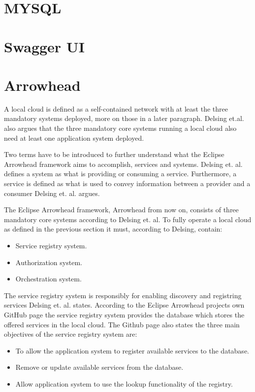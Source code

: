 \section{MYSQL}
\section{Swagger UI}
\section{Arrowhead}
A local cloud is defined as a self-contained network with at least the three mandatory systems deployed, more on those in a later paragraph. 
Delsing et.al. also argues that the three mandatory core systems running a local cloud also need at least one application system deployed.\cite{Delsing2017}

Two terms have to be introduced to further understand what the Eclipse Arrowhead framework aims to accomplish, services and systems.
Delsing et. al. defines a system as what is providing or consuming a service.\cite{Delsing2017} 
Furthermore, a service is defined as what is used to convey information between a provider and a consumer Delsing et. al. argues.\cite{Delsing2017}

The Eclipse Arrowhead framework, Arrowhead from now on, consists of three mandatory core systems according to Delsing et. al.\cite{Delsing2017}
To fully operate a local cloud as defined in the previous section it must, according to Delsing, contain:
\begin{itemize}
    \item Service registry system.
    \item Authorization system. 
    \item Orchestration system.\cite{Delsing2017}
\end{itemize} 

The service registry system is responsibly for enabling discovery and registring services Delsing et. al. states.\cite{Delsing2017} 
According to the Eclipse Arrowhead projects own GitHub page the service registry system provides the database which stores the offered services in the local cloud.\cite{Github2021}
The Github page also states the three main objectives of the service registry system are:
\begin{itemize}
    \item To allow the application system to register available services to the database. 
    \item Remove or update available services from the database.
    \item Allow application system to use the lookup functionality of the registry.
\end{itemize}

